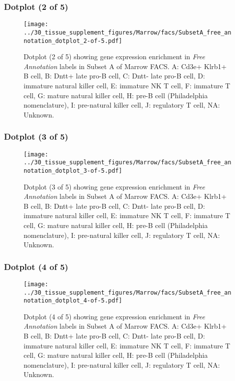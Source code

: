 \clearpage

\subsubsection{Dotplot (2 of 5)}
\begin{figure}[h]
\centering
\texttt{[image: ../30\_tissue\_supplement\_figures/Marrow/facs/SubsetA\_free\_annotation\_dotplot\_2-of-5.pdf]}

\caption{ Dotplot (2 of 5)  showing gene expression enrichment in \emph{Free Annotation} labels in Subset A of Marrow FACS. A: Cd3e+ Klrb1+ B cell, B: Dntt+ late pro-B cell, C: Dntt- late pro-B cell, D: immature natural killer cell, E: immature NK T cell, F: immature T cell, G: mature natural killer cell, H: pre-B cell (Philadelphia nomenclature), I: pre-natural killer cell, J: regulatory T cell, NA: Unknown.}
\end{figure}


\clearpage

\subsubsection{Dotplot (3 of 5)}
\begin{figure}[h]
\centering
\texttt{[image: ../30\_tissue\_supplement\_figures/Marrow/facs/SubsetA\_free\_annotation\_dotplot\_3-of-5.pdf]}

\caption{ Dotplot (3 of 5)  showing gene expression enrichment in \emph{Free Annotation} labels in Subset A of Marrow FACS. A: Cd3e+ Klrb1+ B cell, B: Dntt+ late pro-B cell, C: Dntt- late pro-B cell, D: immature natural killer cell, E: immature NK T cell, F: immature T cell, G: mature natural killer cell, H: pre-B cell (Philadelphia nomenclature), I: pre-natural killer cell, J: regulatory T cell, NA: Unknown.}
\end{figure}


\clearpage

\subsubsection{Dotplot (4 of 5)}
\begin{figure}[h]
\centering
\texttt{[image: ../30\_tissue\_supplement\_figures/Marrow/facs/SubsetA\_free\_annotation\_dotplot\_4-of-5.pdf]}

\caption{ Dotplot (4 of 5)  showing gene expression enrichment in \emph{Free Annotation} labels in Subset A of Marrow FACS. A: Cd3e+ Klrb1+ B cell, B: Dntt+ late pro-B cell, C: Dntt- late pro-B cell, D: immature natural killer cell, E: immature NK T cell, F: immature T cell, G: mature natural killer cell, H: pre-B cell (Philadelphia nomenclature), I: pre-natural killer cell, J: regulatory T cell, NA: Unknown.}
\end{figure}


